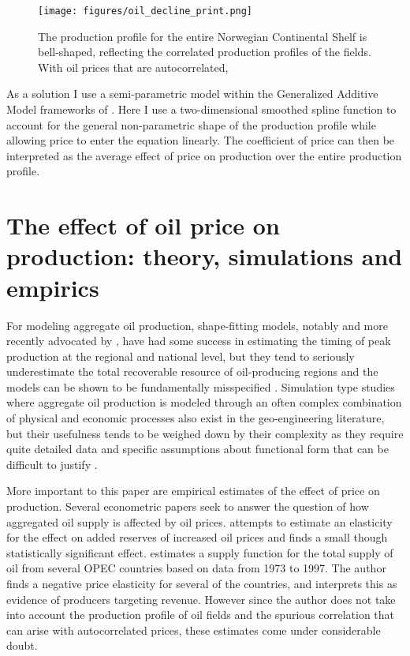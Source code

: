 \documentclass[11pt]{article}
\begin{document}
\begin{figure}
	\texttt{[image: figures/oil\_decline\_print.png]}
	\caption{The production profile for the entire Norwegian Continental Shelf is bell-shaped, reflecting the correlated production profiles of the fields.  With oil prices that are autocorrelated, }
	\label{oil_decline}
\end{figure}

As a solution I use a semi-parametric model within the Generalized Additive Model frameworks of \cite{hastie_generalized_1990}.  Here I use a two-dimensional smoothed spline function to account for the general non-parametric shape of the production profile while allowing price to enter the equation linearly.  The coefficient of price can then be interpreted as the average effect of price on production over the entire production profile.

\FloatBarrier
\section{The effect of oil price on production: theory, simulations and empirics}

For modeling aggregate oil production, shape-fitting models, notably \citet{hubbert_energy_1962} and more recently advocated by \citet{deffeyes_hubberts_2001}, have had some success in estimating the timing of peak production at the regional and national level, but they tend to seriously underestimate the total recoverable resource of oil-producing regions and the models can be shown to be fundamentally misspecified \citep{boyce_prediction_2013}.   Simulation type studies where aggregate oil production is modeled through an often complex combination of physical and economic processes also exist in the geo-engineering literature, but their usefulness tends to be weighed down by their complexity as they require quite detailed data and specific assumptions about functional form that can be difficult to justify \citet{brandt_review_2010}.

More important to this paper are empirical estimates of the effect of price on production. Several econometric papers seek to answer the question of how aggregated oil supply is affected by oil prices.  \citet{farzin_impact_2001} attempts to estimate an elasticity for the effect on added reserves of increased oil prices and finds a small though statistically significant effect.  \citet{ramcharran_oil_2002} estimates a supply function for the total supply of oil from several OPEC countries based on data from 1973 to 1997.  The author finds a negative price elasticity for several of the countries, and interprets this as evidence of producers targeting revenue.  However since the author does not take into account the production profile of oil fields and the spurious correlation that can arise with autocorrelated prices, these estimates come under considerable doubt.  
\end{document}
